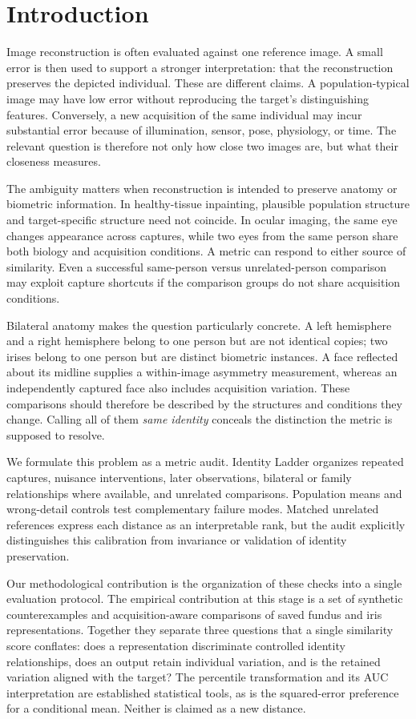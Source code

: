 \documentclass[10pt,twocolumn,letterpaper]{article}
\begin{document}
\section{Introduction}
Image reconstruction is often evaluated against one reference image. A small error is then used to support a stronger interpretation: that the reconstruction preserves the depicted individual. These are different claims. A population-typical image may have low error without reproducing the target's distinguishing features. Conversely, a new acquisition of the same individual may incur substantial error because of illumination, sensor, pose, physiology, or time. The relevant question is therefore not only how close two images are, but what their closeness measures.

The ambiguity matters when reconstruction is intended to preserve anatomy or biometric information. In healthy-tissue inpainting, plausible population structure and target-specific structure need not coincide. In ocular imaging, the same eye changes appearance across captures, while two eyes from the same person share both biology and acquisition conditions. A metric can respond to either source of similarity. Even a successful same-person versus unrelated-person comparison may exploit capture shortcuts if the comparison groups do not share acquisition conditions.

Bilateral anatomy makes the question particularly concrete. A left hemisphere and a right hemisphere belong to one person but are not identical copies; two irises belong to one person but are distinct biometric instances. A face reflected about its midline supplies a within-image asymmetry measurement, whereas an independently captured face also includes acquisition variation. These comparisons should therefore be described by the structures and conditions they change. Calling all of them \emph{same identity} conceals the distinction the metric is supposed to resolve.

We formulate this problem as a metric audit. Identity Ladder organizes repeated captures, nuisance interventions, later observations, bilateral or family relationships where available, and unrelated comparisons. Population means and wrong-detail controls test complementary failure modes. Matched unrelated references express each distance as an interpretable rank, but the audit explicitly distinguishes this calibration from invariance or validation of identity preservation.

Our methodological contribution is the organization of these checks into a single evaluation protocol. The empirical contribution at this stage is a set of synthetic counterexamples and acquisition-aware comparisons of saved fundus and iris representations. Together they separate three questions that a single similarity score conflates: does a representation discriminate controlled identity relationships, does an output retain individual variation, and is the retained variation aligned with the target? The percentile transformation and its AUC interpretation are established statistical tools, as is the squared-error preference for a conditional mean. Neither is claimed as a new distance.
\end{document}

